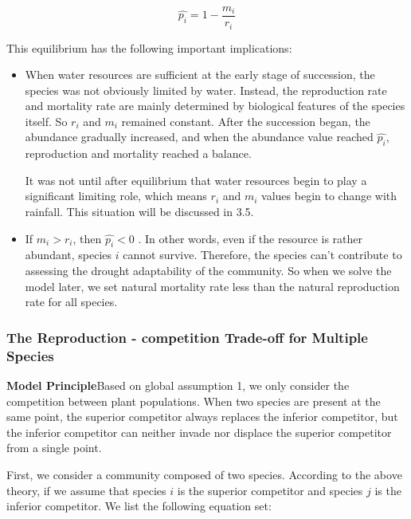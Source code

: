 \documentclass{mcmthesis}
\begin{document}
\begin{equation}
	\label{eq5}
	\hat{p_i}=1-\frac{m_i}{r_i}
\end{equation}

This equilibrium has the following important implications:

\begin{itemize}
	\item When water resources are sufficient at the early stage of succession, the species was not obviously limited by water. Instead, the reproduction rate and mortality rate are mainly determined by biological features of the species itself. So $r_i$ and $m_i$ remained constant. After the succession began, the abundance gradually increased, and when the abundance value reached $\hat{p_i}$, reproduction and mortality reached a balance. 
	
	It was not until after equilibrium that water resources begin to play a significant limiting role, which means $r_i$ and $m_i$ values begin to change with rainfall. This situation will be discussed in 3.5.
	
	
	
	\item If $m_i >r_i$, then $\hat{p_i}<0$ . In other words, even if the resource is rather abundant, species $i$ cannot survive. Therefore, the species can’t contribute to assessing the drought adaptability of the community. So when we solve the model later, we set natural mortality rate less than the natural reproduction rate for all species.
	
\end{itemize}

\subsubsection{The Reproduction - competition Trade-off for Multiple Species}

\textbf{Model Principle}\quad Based on global assumption 1, we only consider the competition between plant populations. When two species are present at the same point, the superior competitor always replaces the inferior competitor, but the inferior competitor can neither invade nor displace the superior competitor from a single point. 

First, we consider a community composed of two species. According to the above theory, if we assume that species $i$ is the superior competitor and species $j$ is the inferior competitor. We list the following equation set:
\end{document}
